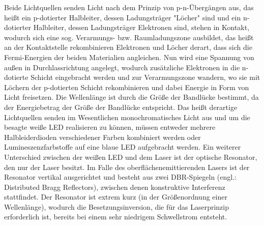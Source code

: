 \documentclass[bigchapter,colorback,accentcolor=tud4b,linedtoc,11pt]{tudreport}
\begin{document}
Beide Lichtquellen senden Licht nach dem Prinzip von p-n-Übergängen aus, das heißt ein p-dotierter Halbleiter, dessen Ladungsträger "Löcher" sind und ein n-dotierter Halbleiter, dessen Ladungsträger Elektronen sind, stehen in Kontakt, wodurch sich eine sog. Verarmungs- bzw. Raumladungszone ausbildet, das heißt an der Kontaktstelle rekombinieren Elektronen und Löcher derart, dass sich die Fermi-Energien der beiden Materialien angleichen. Nun wird eine Spannung von außen in Durchlassrichtung angelegt, wodurch zusätzliche Elektronen in die n-dotierte Schicht eingebracht werden und zur Verarmungszone wandern, wo sie mit Löchern der p-dotierten Schicht rekombinieren und dabei Energie in Form von Licht freisetzen. Die Wellenlänge ist durch die Größe der Bandlücke bestimmt, da der Energiebetrag der Größe der Bandlücke entspricht. Das heißt derartige Lichtquellen senden im Wesentlichen monochromatisches Licht aus und um die besagte weiße LED realisieren zu können, müssen entweder mehrere Halbleiderdioden verschiedener Farben kombiniert werden oder Lumineszenzfarbstoffe auf eine blaue LED aufgebracht werden. Ein weiterer Unterschied zwischen der weißen LED und dem Laser ist der optische Resonator, den nur der Laser besitzt. Im Falle des oberflächenemittierenden Lasers ist der Resonator vertikal ausgerichtet und besteht aus zwei DBR-Spiegeln (engl.: Distributed Bragg Reflectors), zwischen denen konstruktive Interferenz stattfindet. Der Resonator ist extrem kurz (in der Größenordnung einer Wellenlänge), wodurch die Besetzungsinversion, die für das Laserprinzip erforderlich ist, bereits bei einem sehr niedrigem Schwellstrom entsteht.


% 								
% 								
% 								
\end{document}
